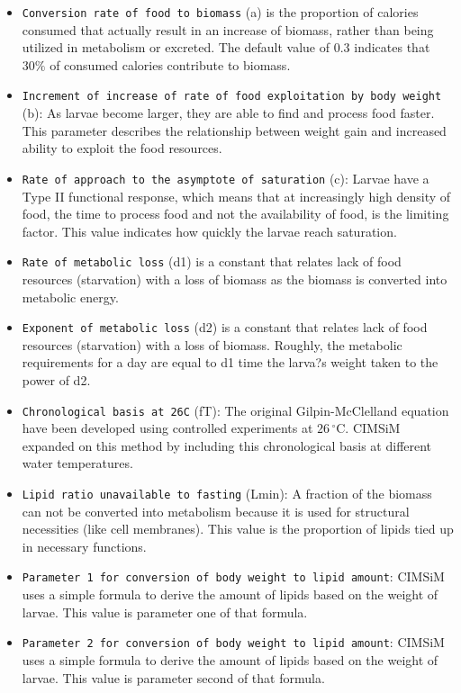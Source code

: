 \documentclass[11pt]{article}
\newcommand{\linecmd}[1]{\texttt{#1}}
\begin{document}
\begin{itemize}
	\item \linecmd{Conversion rate of food to biomass} (a) is the proportion of calories consumed that actually result in an increase of biomass, rather than being utilized in metabolism or excreted. The default value of $0.3$ indicates that $30\%$ of consumed calories contribute to biomass.
	\item \linecmd{Increment of increase of rate of food exploitation by body weight} (b): As larvae become larger, they are able to find and process food faster. This parameter describes the relationship between weight gain and increased ability to exploit the food resources.
	\item \linecmd{Rate of approach to the asymptote of saturation} (c): Larvae have a Type II functional response, which means that at increasingly high density of food, the time to process food and not the availability of food, is the limiting factor. This value indicates how quickly the larvae reach saturation.
	\item \linecmd{Rate of metabolic loss} (d1) is a constant that relates lack of food resources (starvation) with a loss of biomass as the biomass is converted into metabolic energy.
	\item \linecmd{Exponent of metabolic loss} (d2) is a constant that relates lack of food resources (starvation) with a loss of biomass. Roughly, the metabolic requirements for a day are equal to d1 time the larva?s weight taken to the power of d2. 
	\item \linecmd{Chronological basis at 26C} (fT): The original Gilpin-McClelland equation have been developed using controlled experiments at $26\,^{\circ}\mathrm{C}$. CIMSiM expanded on this method by including this chronological basis at different water temperatures.
	\item \linecmd{Lipid ratio unavailable to fasting} (Lmin): A fraction of the biomass can not be converted into metabolism because it is used for structural necessities (like cell membranes). This value is the proportion of lipids tied up in necessary functions.
	\item \linecmd{Parameter 1 for conversion of body weight to lipid amount}: CIMSiM uses a simple formula to derive the amount of lipids based on the weight of larvae. This value is parameter one of that formula.
	\item \linecmd{Parameter 2 for conversion of body weight to lipid amount}: CIMSiM uses a simple formula to derive the amount of lipids based on the weight of larvae. This value is parameter second of that formula.
\end{itemize}
\end{document}

